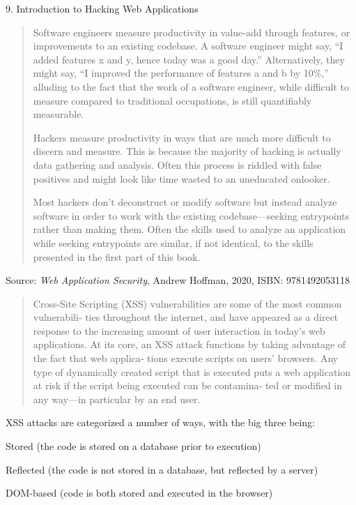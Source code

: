 \documentclass[Screen16to9,17pt]{foils}
\begin{document}
{\large 9. Introduction to Hacking Web Applications}

\begin{quote}
Software engineers measure productivity in value-add through features, or improvements to an existing codebase. A software engineer might say, “I added features x and y, hence today was a good day.” Alternatively, they might say, “I improved the performance of features a and b by 10\%,” alluding to the fact that the work of a software engineer, while difficult to measure compared to traditional occupations, is still quantifiably measurable.

Hackers measure productivity in ways that are much more difficult to discern and measure. This is because the majority of hacking is actually data gathering and analysis. Often this process is riddled with false positives and might look like time wasted to an uneducated onlooker.

Most hackers don’t deconstruct or modify software but instead analyze software in order to work with the existing codebase—seeking entrypoints rather than making them. Often the skills used to analyze an application while seeking entrypoints are similar, if not identical, to the skills presented in the first part of this book.
\end{quote}
Source: \emph{Web Application Security}, Andrew Hoffman, 2020, ISBN: 9781492053118




\begin{quote}
  Cross-Site Scripting (XSS) vulnerabilities are some of the most common vulnerabili‐
  ties throughout the internet, and have appeared as a direct response to the increasing
  amount of user interaction in today’s web applications.
  At its core, an XSS attack functions by taking advantage of the fact that web applica‐
  tions execute scripts on users’ browsers. Any type of dynamically created script that is
  executed puts a web application at risk if the script being executed can be contamina‐
  ted or modified in any way—in particular by an end user.
\end{quote}

XSS attacks are categorized a number of ways, with the big three being:
\begin{list2}
  \item Stored (the code is stored on a database prior to execution)
\item Reflected (the code is not stored in a database, but reflected by a server)
\item DOM-based (code is both stored and executed in the browser)
\end{list2}
\end{document}
